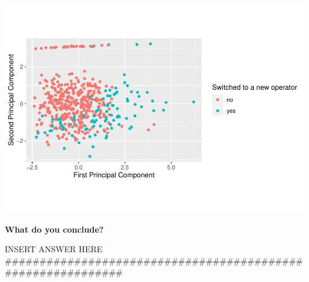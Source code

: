 \documentclass[
]{article}
\begin{document}
\includegraphics{Report_files/figure-latex/unnamed-chunk-30-1.pdf}

\textbf{What do you conclude?}

INSERT ANSWER HERE
\#\#\#\#\#\#\#\#\#\#\#\#\#\#\#\#\#\#\#\#\#\#\#\#\#\#\#\#\#\#\#\#\#\#\#\#\#\#\#\#\#\#\#\#\#\#\#\#\#\#\#\#\#\#\#\#\#\#\#\#
\end{document}
